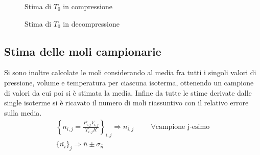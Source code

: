 \documentclass[a4paper,11pt,oneside]{article}
\begin{document}

\begin{figure}[h!]
    \centering
    \caption{Stima di $T_0$ in compressione}
    \label{fig:t0_compressione}
\end{figure}


\begin{figure}[h!]
    \centering
    \caption{Stima di $T_0$ in decompressione}
    \label{fig:t0_decompressione}
\end{figure}


\subsection{Stima delle moli campionarie}
Si sono inoltre calcolate le moli considerando al media fra tutti i singoli valori di pressione, volume e temperatura per ciascuna isoterma, ottenendo un campione di valori da cui poi si è stimata la media. Infine da tutte le stime derivate dalle single isoterme si è ricavato il numero di moli riassuntivo con il relativo errore sulla media.
\begin{gather*}
    \left \{n_{i, j}=\frac{P_{i, j}V_{i, j}}{T_{i, j}R}\right \}_{i, j} \Rightarrow \overline{n_{i, j}} \hspace{1cm}\forall \text{campione j-esimo}\\
    \{\overline{n_{i}}\}_{j} \Rightarrow \overline{n}\pm \sigma_{\overline{n}}
\end{gather*}
\end{document}
